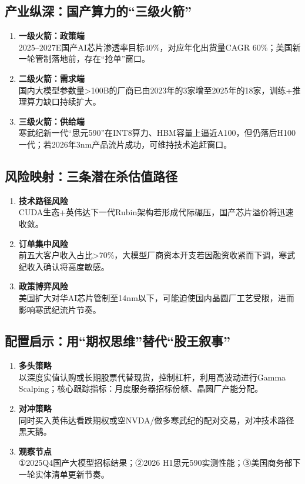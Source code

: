 \subsection{产业纵深：国产算力的“三级火箭”}
\begin{enumerate}[leftmargin=*, nosep]
    \item \textbf{一级火箭：政策端}  \\
    2025–2027E国产AI芯片渗透率目标40\%，对应年化出货量CAGR 60\%；美国新一轮管制落地前，存在“抢单”窗口。
    \item \textbf{二级火箭：需求端}  \\
    国内大模型参数量>100B的厂商已由2023年的3家增至2025年的18家，训练+推理算力缺口持续扩大。
    \item \textbf{三级火箭：供给端}  \\
    寒武纪新一代“思元590”在INT8算力、HBM容量上逼近A100，但仍落后H100一代；若2026年3nm产品流片成功，可维持技术追赶窗口。
\end{enumerate}

\subsection{风险映射：三条潜在杀估值路径}
\begin{enumerate}[leftmargin=*, nosep]
    \item \textbf{技术路径风险}  \\
    CUDA生态+英伟达下一代Rubin架构若形成代际碾压，国产芯片溢价将迅速收敛。
    \item \textbf{订单集中风险}  \\
    前五大客户收入占比>70\%，大模型厂商资本开支若因融资收紧而下调，寒武纪收入确认将高度敏感。
    \item \textbf{政策博弈风险}  \\
    美国扩大对华AI芯片管制至14nm以下，可能迫使国内晶圆厂工艺受限，进而影响寒武纪流片节奏。
\end{enumerate}

\subsection{配置启示：用“期权思维”替代“股王叙事”}
\begin{enumerate}[leftmargin=*, nosep]
    \item \textbf{多头策略}  \\
    以深度实值认购或长期股票代替现货，控制杠杆，利用高波动进行Gamma Scalping；核心跟踪指标：月度服务器招标份额、晶圆厂产能分配。
    \item \textbf{对冲策略}  \\
    同时买入英伟达看跌期权或空NVDA/做多寒武纪的配对交易，对冲技术路径黑天鹅。
    \item \textbf{观察节点}  \\
    ①2025Q4国产大模型招标结果；②2026 H1思元590实测性能；③美国商务部下一轮实体清单更新节奏。
\end{enumerate}


